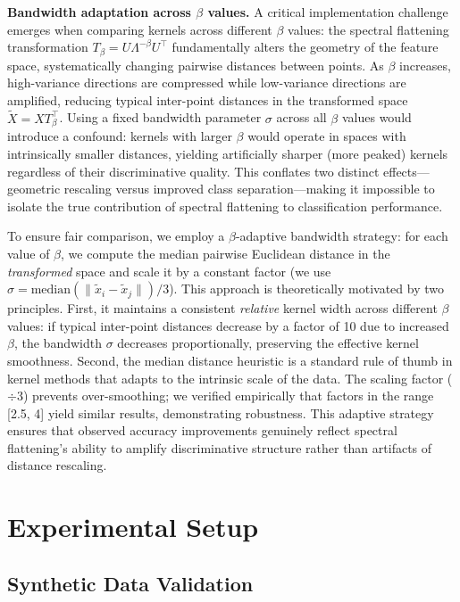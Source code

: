 \documentclass[11pt]{article}
\begin{document}
\textbf{Bandwidth adaptation across $\beta$ values.} A critical implementation challenge emerges when comparing kernels across different $\beta$ values: the spectral flattening transformation $T_\beta = U \Lambda^{-\beta} U^\top$ fundamentally alters the geometry of the feature space, systematically changing pairwise distances between points. As $\beta$ increases, high-variance directions are compressed while low-variance directions are amplified, reducing typical inter-point distances in the transformed space $\tilde{X} = X T_\beta^\top$. Using a fixed bandwidth parameter $\sigma$ across all $\beta$ values would introduce a confound: kernels with larger $\beta$ would operate in spaces with intrinsically smaller distances, yielding artificially sharper (more peaked) kernels regardless of their discriminative quality. This conflates two distinct effects---geometric rescaling versus improved class separation---making it impossible to isolate the true contribution of spectral flattening to classification performance.

To ensure fair comparison, we employ a $\beta$-adaptive bandwidth strategy: for each value of $\beta$, we compute the median pairwise Euclidean distance in the \emph{transformed} space and scale it by a constant factor (we use $\sigma = \text{median}(\|\tilde{x}_i - \tilde{x}_j\|)/3$). This approach is theoretically motivated by two principles. First, it maintains a consistent \emph{relative} kernel width across different $\beta$ values: if typical inter-point distances decrease by a factor of 10 due to increased $\beta$, the bandwidth $\sigma$ decreases proportionally, preserving the effective kernel smoothness. Second, the median distance heuristic is a standard rule of thumb in kernel methods \cite{scholkopf2002learning} that adapts to the intrinsic scale of the data. The scaling factor ($\div 3$) prevents over-smoothing; we verified empirically that factors in the range [2.5, 4] yield similar results, demonstrating robustness. This adaptive strategy ensures that observed accuracy improvements genuinely reflect spectral flattening's ability to amplify discriminative structure rather than artifacts of distance rescaling.

\section{Experimental Setup}

\subsection{Synthetic Data Validation}
\end{document}
